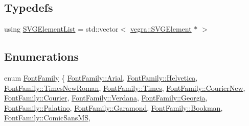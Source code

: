 \subsection*{Typedefs}
\begin{DoxyCompactItemize}
\item 
using \mbox{\hyperlink{namespacevegra_a2722f5eceb74f65746a02a57b71d125e}{S\+V\+G\+Element\+List}} = std\+::vector$<$ \mbox{\hyperlink{structvegra_1_1SVGElement}{vegra\+::\+S\+V\+G\+Element}} $\ast$ $>$
\end{DoxyCompactItemize}
\subsection*{Enumerations}
\begin{DoxyCompactItemize}
\item 
enum \mbox{\hyperlink{namespacevegra_a342c4e8c946c4f729d694257d1ed876b}{Font\+Family}} \{ \newline
\mbox{\hyperlink{namespacevegra_a342c4e8c946c4f729d694257d1ed876ba6fbda3a3567da6d01bc9da915e91d702}{Font\+Family\+::\+Arial}}, 
\mbox{\hyperlink{namespacevegra_a342c4e8c946c4f729d694257d1ed876ba9b846c60f2b2d24b350f55077e4dd894}{Font\+Family\+::\+Helvetica}}, 
\mbox{\hyperlink{namespacevegra_a342c4e8c946c4f729d694257d1ed876babf103d5f351643099afbb4cc28ba9946}{Font\+Family\+::\+Times\+New\+Roman}}, 
\mbox{\hyperlink{namespacevegra_a342c4e8c946c4f729d694257d1ed876bab3ac111fd7521343dd1a3fabce8279c2}{Font\+Family\+::\+Times}}, 
\newline
\mbox{\hyperlink{namespacevegra_a342c4e8c946c4f729d694257d1ed876ba96e248eff9ac321d7f79d2cdb142f49c}{Font\+Family\+::\+Courier\+New}}, 
\mbox{\hyperlink{namespacevegra_a342c4e8c946c4f729d694257d1ed876ba5055d1a4444c630d6839f48ab48aef91}{Font\+Family\+::\+Courier}}, 
\mbox{\hyperlink{namespacevegra_a342c4e8c946c4f729d694257d1ed876ba207c321933d5e7273bf3defb9eca01af}{Font\+Family\+::\+Verdana}}, 
\mbox{\hyperlink{namespacevegra_a342c4e8c946c4f729d694257d1ed876baeada819634d0164c6a7547bdcc405033}{Font\+Family\+::\+Georgia}}, 
\newline
\mbox{\hyperlink{namespacevegra_a342c4e8c946c4f729d694257d1ed876ba3dbbdc472c939827d1aa5e8c51f7aa85}{Font\+Family\+::\+Palatino}}, 
\mbox{\hyperlink{namespacevegra_a342c4e8c946c4f729d694257d1ed876ba96a7872564f8ba8cb1d2975a13bde360}{Font\+Family\+::\+Garamond}}, 
\mbox{\hyperlink{namespacevegra_a342c4e8c946c4f729d694257d1ed876ba3919198dda599c06f83ad77a698598ce}{Font\+Family\+::\+Bookman}}, 
\mbox{\hyperlink{namespacevegra_a342c4e8c946c4f729d694257d1ed876ba7162619c10d2933c5dd5afa5c8012b8b}{Font\+Family\+::\+Comic\+Sans\+MS}}, 

\end{DoxyCompactItemize}
